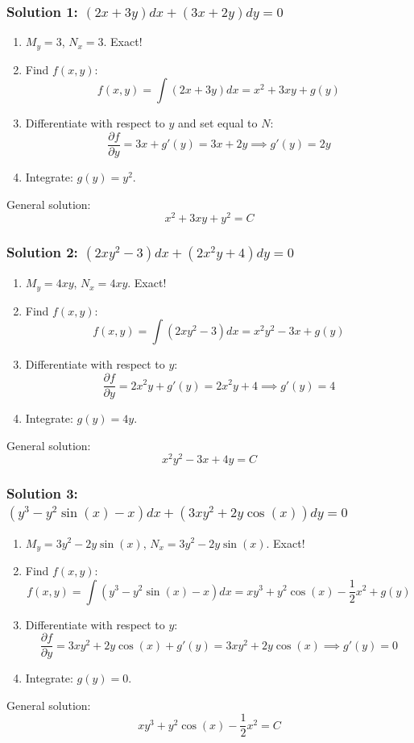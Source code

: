 \documentclass[11pt,letterpaper]{article}
\begin{document}
\subsubsection*{Solution 1: $(2x + 3y)dx + (3x + 2y)dy = 0$}
\begin{enumerate}
    \item $M_y = 3$, $N_x = 3$. Exact!
    \item Find $f(x,y)$:
    \[ f(x,y) = \int (2x + 3y)dx = x^2 + 3xy + g(y) \]
    \item Differentiate with respect to $y$ and set equal to $N$:
    \[ \frac{\partial f}{\partial y} = 3x + g'(y) = 3x + 2y \implies g'(y) = 2y \]
    \item Integrate: $g(y) = y^2$.
\end{enumerate}
General solution:
\[ x^2 + 3xy + y^2 = C \]

\subsubsection*{Solution 2: $(2xy^2 - 3)dx + (2x^2y + 4)dy = 0$}
\begin{enumerate}
    \item $M_y = 4xy$, $N_x = 4xy$. Exact!
    \item Find $f(x,y)$:
    \[ f(x,y) = \int (2xy^2 - 3)dx = x^2 y^2 - 3x + g(y) \]
    \item Differentiate with respect to $y$:
    \[ \frac{\partial f}{\partial y} = 2x^2 y + g'(y) = 2x^2 y + 4 \implies g'(y) = 4 \]
    \item Integrate: $g(y) = 4y$.
\end{enumerate}
General solution:
\[ x^2 y^2 - 3x + 4y = C \]

\subsubsection*{Solution 3: $(y^3 - y^2\sin(x) - x)dx + (3xy^2 + 2y\cos(x))dy = 0$}
\begin{enumerate}
    \item $M_y = 3y^2 - 2y\sin(x)$, $N_x = 3y^2 - 2y\sin(x)$. Exact!
    \item Find $f(x,y)$:
    \[ f(x,y) = \int (y^3 - y^2\sin(x) - x)dx = xy^3 + y^2\cos(x) - \frac{1}{2}x^2 + g(y) \]
    \item Differentiate with respect to $y$:
    \[ \frac{\partial f}{\partial y} = 3xy^2 + 2y\cos(x) + g'(y) = 3xy^2 + 2y\cos(x) \implies g'(y) = 0 \]
    \item Integrate: $g(y) = 0$.
\end{enumerate}
General solution:
\[ xy^3 + y^2\cos(x) - \frac{1}{2}x^2 = C \]
\end{document}
